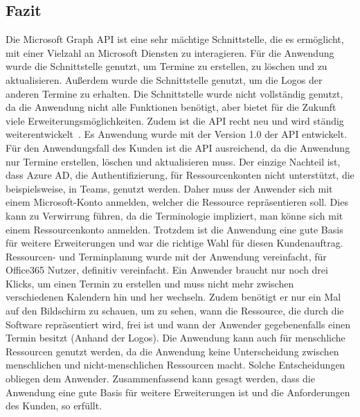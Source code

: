 \subsection{Fazit}\label{subsec:fazit}
Die Microsoft Graph API ist eine sehr mächtige Schnittstelle, die es ermöglicht, mit einer Vielzahl an Microsoft Diensten zu interagieren.
Für die Anwendung wurde die Schnittstelle genutzt, um Termine zu erstellen, zu löschen und zu aktualisieren.
Außerdem wurde die Schnittstelle genutzt, um die Logos der anderen Termine zu erhalten.
Die Schnittstelle wurde nicht vollständig genutzt, da die Anwendung nicht alle Funktionen benötigt, aber bietet für die Zukunft viele Erweiterungsmöglichkeiten.
Zudem ist die API recht neu und wird ständig weiterentwickelt~\cite{microsoft-graph-api-version}.
Es Anwendung wurde mit der Version 1.0 der API entwickelt.
Für den Anwendungsfall des Kunden ist die API ausreichend, da die Anwendung nur Termine erstellen, löschen und aktualisieren muss.
Der einzige Nachteil ist, dass Azure AD, die Authentifizierung, für Ressourcenkonten nicht unterstützt, die beispielsweise, in Teams, genutzt werden.
Daher muss der Anwender sich mit einem Microsoft-Konto anmelden, welcher die Ressource repräsentieren soll.
Dies kann zu Verwirrung führen, da die Terminologie impliziert, man könne sich mit einem Ressourcenkonto anmelden.
\newline
\newline
Trotzdem ist die Anwendung eine gute Basis für weitere Erweiterungen und war die richtige Wahl für diesen Kundenauftrag.
Ressourcen- und Terminplanung wurde mit der Anwendung vereinfacht, für Office365 Nutzer, definitiv vereinfacht.
Ein Anwender braucht nur noch drei Klicks, um einen Termin zu erstellen und muss nicht mehr zwischen verschiedenen Kalendern hin und her wechseln.
Zudem benötigt er nur ein Mal auf den Bildschirm zu schauen, um zu sehen, wann die Ressource, die durch die Software repräsentiert wird, frei ist und wann der Anwender gegebenenfalls einen Termin besitzt (Anhand der Logos).
\newline
\newline
Die Anwendung kann auch für menschliche Ressourcen genutzt werden, da die Anwendung keine Unterscheidung zwischen menschlichen und nicht-menschlichen Ressourcen macht.
Solche Entscheidungen obliegen dem Anwender.
\newline
\newline
Zusammenfassend kann gesagt werden, dass die Anwendung eine gute Basis für weitere Erweiterungen ist und die Anforderungen des Kunden, so erfüllt.
